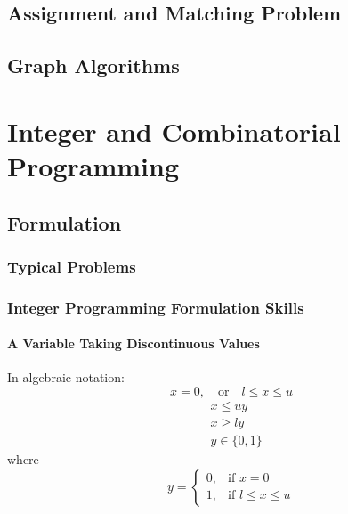 \documentclass[10pt]{book}
\begin{document}
		\chapter{Assignment and Matching Problem}

		\chapter{Graph Algorithms}

	\part{Integer and Combinatorial Programming}
		\chapter{Formulation}
			\section{Typical Problems}

			\section{Integer Programming Formulation Skills}
				\subsection{A Variable Taking Discontinuous Values}
					 In algebraic notation: 
					\begin{equation}
						x = 0,\quad \text{or} \quad l\le x \le u \nonumber
					\end{equation}
					\begin{align}
						& x \le uy\nonumber \\
						& x \ge ly \nonumber \\
						& y \in \{0, 1\} \nonumber
					\end{align}
					where
					\begin{equation}y=\begin{cases}0, & \text{if }x=0 \\ 1, & \text{if } l\le x \le u\end{cases}\nonumber \end{equation}
						
\end{document}
